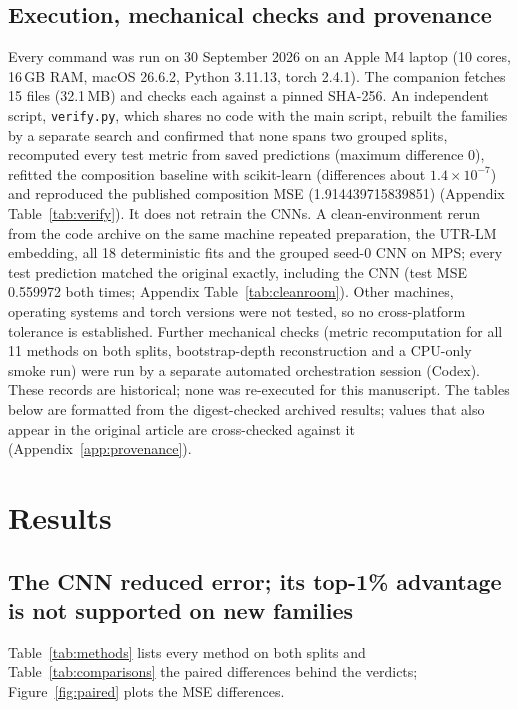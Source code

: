 \documentclass[11pt]{article}
\newcommand{\m}[1]{\texttt{#1}}
\begin{document}
\subsection{Execution, mechanical checks and provenance}\label{sec:provenance}
Every command was run on 30 September 2026 on an Apple M4 laptop (10 cores, 16\,GB RAM, macOS 26.6.2, Python 3.11.13,
torch 2.4.1). The companion fetches 15 files (32.1\,MB) and checks each against a pinned SHA-256. An independent
script, \m{verify.py}, which shares no code with the main script, rebuilt the \Components{} families by a separate
search and confirmed that none spans two grouped splits, recomputed every test metric from saved predictions
(maximum difference 0), refitted the composition baseline with scikit-learn (differences about $1.4\times10^{-7}$)
and reproduced the published composition MSE (1.914439715839851) (Appendix Table~\ref{tab:verify}). It does not
retrain the CNNs. A clean-environment rerun from the code archive on the same machine repeated preparation, the
UTR-LM embedding, all 18 deterministic fits and the grouped seed-0 CNN on MPS; every test prediction matched the
original exactly, including the CNN (test MSE 0.559972 both times; Appendix Table~\ref{tab:cleanroom}). Other
machines, operating systems and torch versions were not tested, so no cross-platform tolerance is established.
Further mechanical checks (metric recomputation for all 11 methods on both splits, bootstrap-depth reconstruction and
a CPU-only smoke run) were run by a separate automated orchestration session (Codex). These records are historical;
none was re-executed for this manuscript. The tables below are formatted from the digest-checked archived results;
values that also appear in the original article are cross-checked against it (Appendix~\ref{app:provenance}).

\section{Results}\label{sec:results}

\subsection{The CNN reduced error; its top-1\% advantage is not supported on new families}\label{sec:main}
Table~\ref{tab:methods} lists every method on both splits and Table~\ref{tab:comparisons} the paired differences
behind the verdicts; Figure~\ref{fig:paired} plots the MSE differences.
\end{document}
